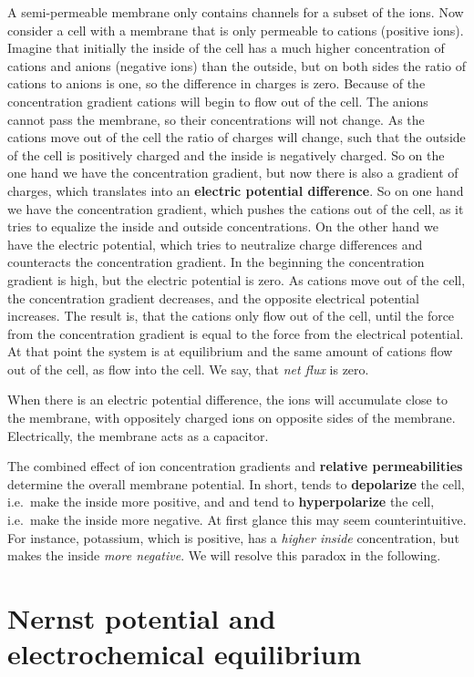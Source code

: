 A semi-permeable membrane only contains channels for a subset of the ions. Now consider a cell with a membrane that is only permeable to cations (positive ions). Imagine that initially the inside of the cell has a much higher concentration of cations and anions (negative ions) than the outside, but on both sides the ratio of cations to anions is one, so the difference in charges is zero. Because of the concentration gradient cations will begin to flow out of the cell. The anions cannot pass the membrane, so their concentrations will not change. As the cations move out of the cell the ratio of charges will change, such that the outside of the cell is positively charged and the inside is negatively charged. So on the one hand we have the concentration gradient, but now there is also a gradient of charges, which translates into an \textbf{electric potential difference}. So on one hand we have the concentration gradient, which pushes the cations out of the cell, as it tries to equalize the inside and outside concentrations. On the other hand we have the electric potential, which tries to neutralize charge differences and counteracts the concentration gradient. In the beginning the concentration gradient is high, but the electric potential is zero. As cations move out of the cell, the concentration gradient decreases, and the opposite electrical potential increases. The result is, that the cations only flow out of the cell, until the force from the concentration gradient is equal to the force from the electrical potential. At that point the system is at equilibrium and the same amount of cations flow out of the cell, as flow into the cell. We say, that \textit{net flux} is zero.

When there is an electric potential difference, the ions will accumulate close to the membrane, with oppositely charged ions on opposite sides of the membrane. Electrically, the membrane acts as a capacitor.

The combined effect of ion concentration gradients and \textbf{relative permeabilities} determine the overall membrane potential. In short,  tends to \textbf{depolarize} the cell, i.e.\ make the inside more positive, and  and  tend to \textbf{hyperpolarize} the cell, i.e.\ make the inside more negative. At first glance this may seem counterintuitive. For instance, potassium, which is positive, has a \textit{higher inside} concentration, but makes the inside \textit{more negative}. We will resolve this paradox in the following.

\section{Nernst potential and electrochemical equilibrium}

